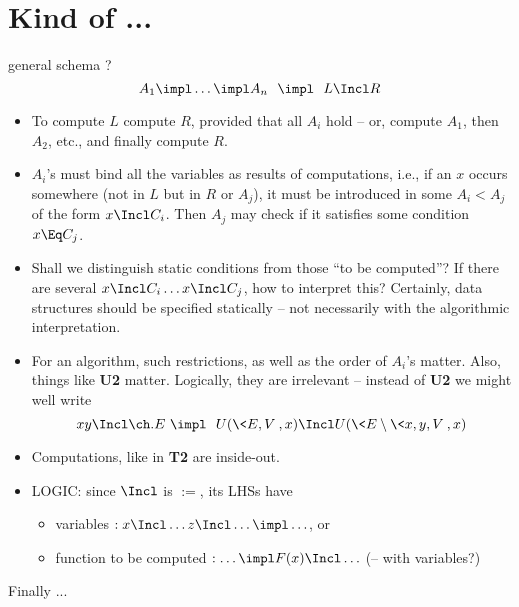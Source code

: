 \documentclass[leqno]{article}
\begin{document}
\newpage\section{Kind of ...}
general schema ?
\[A_1 \impl \ldots \impl A_n\ \ \impl\ \ L\Incl R\]
\begin{itemize}\MyLPar
\item 
To compute $L$ compute $R$, provided that all $A_i$ hold -- or, compute $A_1$, 
then $A_2$, etc., and finally compute $R$.
\item
$A_i$'s must bind all the variables as results of computations, i.e., if an $x$ occurs 
somewhere (not in $L$ but in $R$ or $A_j$), it must be introduced in some $A_i<A_j$ of 
the form $x\Incl C_i$. Then $A_j$ may check if it satisfies some condition $x\Eq C_j$.
\item
Shall we distinguish static conditions from those ``to be computed''? If there are 
several $x\Incl C_i\ldots x\Incl C_j$, how to interpret this?
Certainly, data structures should be specified statically -- not necessarily with the
algorithmic interpretation.
\item
For an algorithm, such restrictions, as well as the order of $A_i$'s matter. 
Also, things like {\bf U2} matter. Logically, they are irrelevant -- instead of {\bf U2}
we might well write 
\[xy\Incl \ch.E\ \impl\ \ U(\<E,V\>,x)\Incl U(\<E\setminus\<x,y,V\>,x) \]
\item Computations, like in {\bf T2} are inside-out.
\item LOGIC: since $\Incl$ is $:=$, its LHSs have 
 \begin{itemize}
  \item variables $:x\Incl\ldots z\Incl\ldots\impl\ldots$, or
  \item function to be computed $:\ldots \impl F(x)\Incl\ldots$ (-- with variables?)
 \end{itemize}
\end{itemize}
Finally ...
\end{document}
